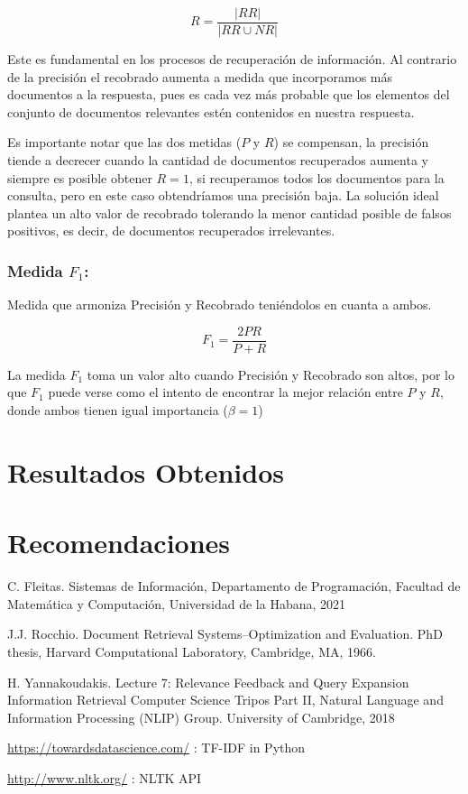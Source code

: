 \documentclass[runningheads,a4paper]{llncs}
\begin{document}
\begin{equation}
	R = \frac{|RR|}{|RR \cup NR|}
\end{equation}

Este es fundamental en los procesos de
recuperación de información. Al contrario de la precisión el recobrado
aumenta a medida que incorporamos más documentos a la respuesta, pues es
cada vez más probable que los elementos del conjunto de documentos relevantes
estén contenidos en nuestra respuesta.

Es importante notar que las dos metidas ($P$ y $R$) se compensan, la precisión tiende a decrecer cuando la cantidad
de documentos recuperados aumenta y siempre es posible obtener $R = 1$, si recuperamos todos los documentos para la consulta, pero en este caso obtendríamos una precisión baja. La solución ideal plantea un alto valor de recobrado tolerando la menor cantidad posible de falsos positivos, es decir, de documentos recuperados irrelevantes.

\subsubsection*{Medida $F_1$:} Medida que armoniza Precisión y Recobrado teniéndolos en cuanta a ambos.

\begin{equation}
	F_1 = \frac{2 PR}{P + R}
\end{equation}

La medida $F_1$ toma un valor alto cuando Precisión y Recobrado son altos, por lo que $F_1$ puede verse como el intento de encontrar la mejor relación entre $P$ y $R$, donde ambos tienen igual importancia ($\beta = 1$)

\section{Resultados Obtenidos}

\section{Recomendaciones}

\begin{thebibliography}{4}

 C. Fleitas. Sistemas de Información, Departamento de Programación, Facultad de Matemática y Computación, Universidad de la Habana, 2021

 J.J. Rocchio. Document Retrieval Systems–Optimization and Evaluation.
PhD thesis, Harvard Computational Laboratory, Cambridge, MA, 1966.

 H. Yannakoudakis. Lecture 7: Relevance Feedback and Query
Expansion Information Retrieval Computer Science Tripos Part II, Natural Language and Information Processing (NLIP) Group. University of Cambridge, 2018 

 \url{https://towardsdatascience.com/} : TF-IDF in Python

 \url{http://www.nltk.org/} : NLTK API

\end{thebibliography}
\end{document}
